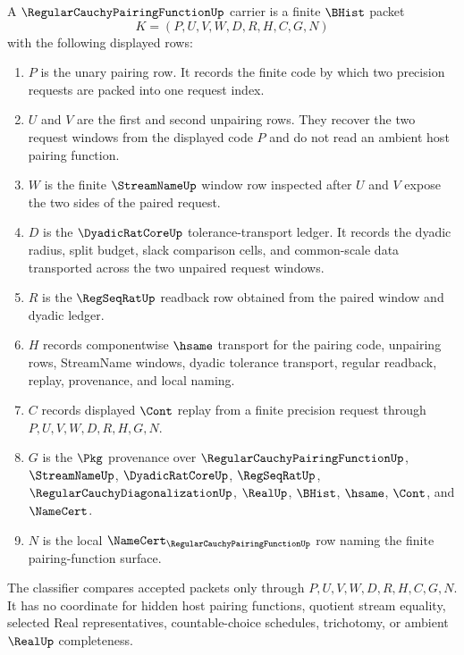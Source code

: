 \begin{definition}
\label{def:regular-cauchy-pairing-function-carrier}
A $\RegularCauchyPairingFunctionUp$ carrier is a finite $\BHist$ packet
$$
K=(P,U,V,W,D,R,H,C,G,N)
$$
with the following displayed rows:
\begin{enumerate}
\item $P$ is the unary pairing row. It records the finite code by which two precision requests are packed into one request index.
\item $U$ and $V$ are the first and second unpairing rows. They recover the two request windows from the displayed code $P$ and do not read an ambient host pairing function.
\item $W$ is the finite $\StreamNameUp$ window row inspected after $U$ and $V$ expose the two sides of the paired request.
\item $D$ is the $\DyadicRatCoreUp$ tolerance-transport ledger. It records the dyadic radius, split budget, slack comparison cells, and common-scale data transported across the two unpaired request windows.
\item $R$ is the $\RegSeqRatUp$ readback row obtained from the paired window and dyadic ledger.
\item $H$ records componentwise $\hsame$ transport for the pairing code, unpairing rows, StreamName windows, dyadic tolerance transport, regular readback, replay, provenance, and local naming.
\item $C$ records displayed $\Cont$ replay from a finite precision request through $P,U,V,W,D,R,H,G,N$.
\item $G$ is the $\Pkg$ provenance over $\RegularCauchyPairingFunctionUp$, $\StreamNameUp$, $\DyadicRatCoreUp$, $\RegSeqRatUp$, $\RegularCauchyDiagonalizationUp$, $\RealUp$, $\BHist$, $\hsame$, $\Cont$, and $\NameCert$.
\item $N$ is the local $\NameCert_{\RegularCauchyPairingFunctionUp}$ row naming the finite pairing-function surface.
\end{enumerate}
The classifier compares accepted packets only through $P,U,V,W,D,R,H,C,G,N$. It has no coordinate for hidden host pairing functions, quotient stream equality, selected Real representatives, countable-choice schedules, trichotomy, or ambient $\RealUp$ completeness.
\end{definition}


